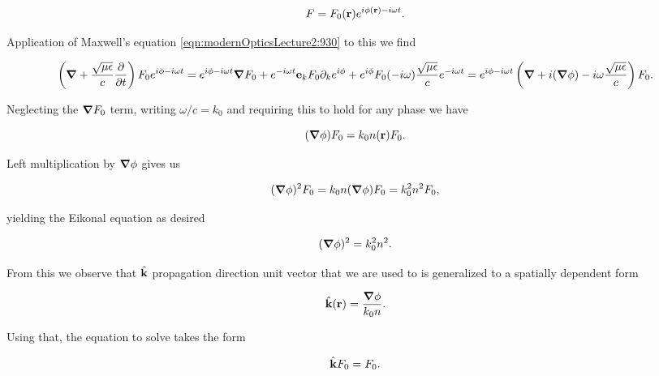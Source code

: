 {\begin{equation}\label{eqn:modernOpticsLecture2:990b}
F = F_0(\mathbf{r}) e^{i \phi(\mathbf{r}) - i\omega t}.
\end{equation}

Application of Maxwell's equation \ref{eqn:modernOpticsLecture2:930} to this we find

\begin{dmath}\label{eqn:modernOpticsLecture2:1010}
\left( \spacegrad + \frac{\sqrt{\mu \epsilon}}{c} \PD{t}{} \right) F_0
e^{i \phi - i\omega t}
=
e^{i \phi - i\omega t} \spacegrad F_0 + 
e^{- i\omega t} \Be_k F_0 \partial_k e^{i \phi}
+ 
e^{i \phi} F_0 (-i\omega) \frac{\sqrt{\mu\epsilon}}{c} e^{-i\omega t}
=
e^{i \phi - i\omega t} 
\left(
\spacegrad + i (\spacegrad \phi) 
-i\omega \frac{\sqrt{\mu\epsilon}}{c} 
\right) F_0.
\end{dmath}

Neglecting the $\boldsymbol{\nabla} F_0$ term, writing $\omega/c = k_0$ and requiring this to hold for any phase we have

\begin{dmath}\label{eqn:modernOpticsLecture2:1030a}
(\spacegrad \phi) F_0 = k_0 n(\Br) F_0.
\end{dmath}

Left multiplication by $\boldsymbol{\nabla} \phi$ gives us

\begin{dmath}\label{eqn:modernOpticsLecture2:1090}
(\spacegrad \phi)^2 F_0 = k_0 n (\spacegrad \phi) F_0 = k_0^2 n^2 F_0,
\end{dmath}

yielding the Eikonal equation as desired

\begin{dmath}\label{eqn:modernOpticsLecture2:1110}
(\spacegrad \phi)^2 = k_0^2 n^2.
\end{dmath}

From this we observe that $\hat{\mathbf{k}}$ propagation direction unit vector that we are used to is generalized to a spatially dependent form

\begin{dmath}\label{eqn:modernOpticsLecture2:1130a}
\kcap(\Br) = \frac{\spacegrad \phi}{k_0 n}.
\end{dmath}

Using that, the equation to solve takes the form

\begin{dmath}\label{eqn:modernOpticsLecture2:1030b}
\kcap F_0 = F_0.
\end{dmath}

}
